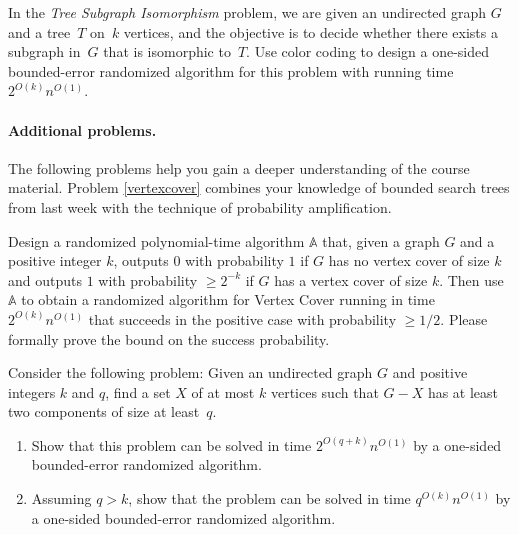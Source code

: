 \documentclass[english]{uebung_cs}
\begin{document}
\begin{exercise}
In the \emph{Tree Subgraph Isomorphism} problem, we are given an undirected graph $G$ and a tree~$T$ on~$k$ vertices, and the objective is to decide whether there exists a subgraph in~$G$ that is isomorphic to~$T$. Use color coding to design a one-sided bounded-error randomized algorithm for this problem with running time $2^{O(k)}n^{O(1)}$.
\end{exercise}

\sepline
\paragraph*{Additional problems.} The following problems help you gain a deeper understanding of the course material. Problem \ref{vertexcover} combines your knowledge of bounded search trees from last week with the technique of probability amplification.

\begin{exercise}\label{vertexcover}
Design a randomized polynomial-time algorithm $\mathbb{A}$ that, given a graph $G$ and a positive integer $k$, outputs $0$ with probability $1$ if $G$ has no vertex cover of size $k$ and outputs $1$ with probability $\geq 2^{-k}$ if $G$ has a vertex cover of size $k$.
Then use $\mathbb{A}$ to obtain a randomized algorithm for Vertex Cover running in time $2^{O(k)} n^{O(1)}$ that succeeds in the positive case with probability $\geq 1/2$. Please formally prove the bound on the success probability.
\end{exercise}

\begin{exercise}
  Consider the following problem: Given an undirected graph $G$ and positive integers $k$ and $q$, find a set $X$ of at most $k$ vertices such that $G - X$ has at least two components of size at least~$q$.
  \begin{enumerate}
  \item%
    Show that this problem can be solved in time $2^{O(q+k)}n^{O(1)}$ by a one-sided bounded-error randomized algorithm.
  \item Assuming $q>k$, show that the problem can be solved in time $q^{O(k)}n^{O(1)}$ by a one-sided bounded-error randomized algorithm.
  \end{enumerate}
\end{exercise}

  
\end{document}

